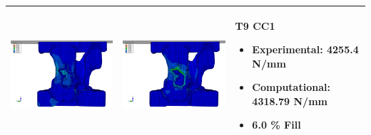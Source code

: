 \documentclass[11pt,a4paper]{article}
\begin{document}
\begin{landscape}
\begin{longtable}{|m{11cm}|m{11cm}|m{4cm}|}
\includegraphics[width=10cm]{images/T9_CC1_postVP_Interface_ABAQUS_All_Side_Stress.png}   & \includegraphics[width=10cm]{images/T9_CC1_postVP_Interface_ABAQUS_All_Side_Strain.png}   & T9 CC1  \begin{itemize} \item Experimental: 	4255.4	N/mm \item Computational:	4318.79 N/mm \item 6.0 \% Fill \end{itemize} \\ \hline 

\end{longtable}
\end{landscape}
\end{document}
